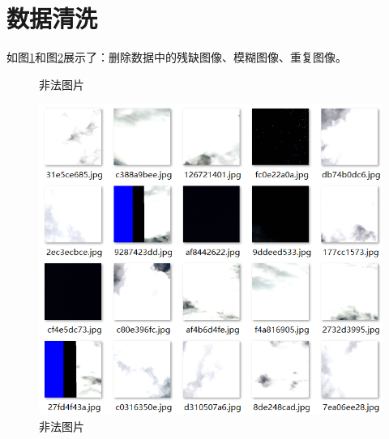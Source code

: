 \section{数据清洗}

如图\ref{fig::model4}和图\ref{fig::model5}展示了：删除数据中的残缺图像、模糊图像、重复图像。

\begin{figure}[htbp]
    \centering
    \caption{非法图片}
	\label{fig::model4}
\end{figure}

\begin{figure}[htbp]
\centering
\includegraphics[width=1\linewidth]{body/model_pic/bad_image3}
\caption{非法图片}
\label{fig::model5}
\end{figure}

